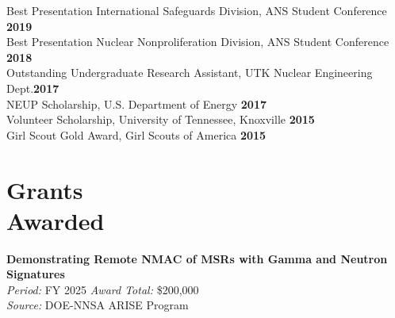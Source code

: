 \documentclass[margin,line]{resume}
\begin{document}
\begin{resume}
        Best Presentation International Safeguards Division, ANS Student Conference \hfill \textbf{2019}\vspace{0.5mm}\\%
        Best Presentation Nuclear Nonproliferation Division, ANS Student Conference \hfill \textbf{2018}\vspace{0.5mm}\\%
        Outstanding Undergraduate Research Assistant, UTK Nuclear Engineering Dept.\hfill \textbf{2017}\vspace{.5mm}\\%
        NEUP Scholarship, U.S. Department of Energy \hfill \textbf{2017}\vspace{0.5mm}\\
        Volunteer Scholarship, University of Tennessee, Knoxville \hfill \textbf{2015}\vspace{0.5mm}\\
        Girl Scout Gold Award, Girl Scouts of America \hfill \textbf{2015}

    \section{\mysidestyle Grants\\Awarded}
    \textbf{Demonstrating Remote NMAC of MSRs with Gamma and Neutron Signatures} \\
    \textsl{Period:} FY 2025 \hfill \textsl{Award Total:} \$200,000\\
    \textsl{Source:} DOE-NNSA ARISE Program \hfill\\


\end{resume}
\end{document}
